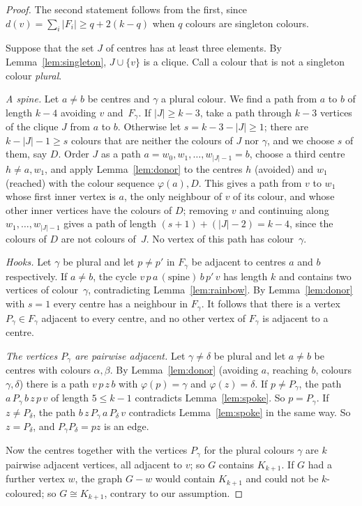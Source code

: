 \documentclass[11pt]{article}
\theoremstyle{remark}
\begin{document}
\begin{proof}
The second statement follows from the first, since
$d(v)=\sum_i|F_i|\ge q+2(k-q)$ when $q$ colours are singleton colours.

Suppose that the set $J$ of centres has at least three elements. By
Lemma~\ref{lem:singleton}, $J\cup\{v\}$ is a clique. Call a colour that is not a
singleton colour \emph{plural}.

\emph{A spine.} Let $a\ne b$ be centres and $\gamma$ a plural colour. We find a
path from $a$ to $b$ of length $k-4$ avoiding $v$ and~$F_\gamma$. If
$|J|\ge k-3$, take a path through $k-3$ vertices of the clique $J$ from $a$ to
$b$. Otherwise let $s=k-3-|J|\ge1$; there are $k-|J|-1\ge s$ colours that are
neither the colours of $J$ nor $\gamma$, and we choose $s$ of them, say $D$.
Order $J$ as a path $a=w_0,w_1,\dots,w_{|J|-1}=b$, choose a third centre $h\ne
a,w_1$, and apply Lemma~\ref{lem:donor} to the centres $h$ (avoided) and $w_1$
(reached) with the colour sequence $\varphi(a),D$. This gives a path from $v$ to
$w_1$ whose first inner vertex is $a$, the only neighbour of $v$ of its colour,
and whose other inner vertices have the colours of $D$; removing $v$ and continuing along $w_1,\dots,w_{|J|-1}$ gives a
path of length $(s+1)+(|J|-2)=k-4$, since the colours of $D$ are not colours
of~$J$. No vertex of this path has colour~$\gamma$.

\emph{Hooks.} Let $\gamma$ be plural and let $p\ne p'$ in $F_\gamma$ be
adjacent to centres $a$ and $b$ respectively. If $a\ne b$, the cycle
$v\,p\,a\,(\text{spine})\,b\,p'\,v$ has length $k$ and contains two vertices of
colour~$\gamma$, contradicting Lemma~\ref{lem:rainbow}. By
Lemma~\ref{lem:donor} with $s=1$ every centre has a neighbour in $F_\gamma$. It
follows that there is a vertex $P_\gamma\in F_\gamma$ adjacent to every centre,
and no other vertex of $F_\gamma$ is adjacent to a centre.

\emph{The vertices $P_\gamma$ are pairwise adjacent.} Let $\gamma\ne\delta$ be
plural and let $a\ne b$ be centres with colours $\alpha,\beta$. By
Lemma~\ref{lem:donor} (avoiding $a$, reaching $b$, colours $\gamma,\delta$)
there is a path $v\,p\,z\,b$ with $\varphi(p)=\gamma$ and
$\varphi(z)=\delta$. If $p\ne P_\gamma$, the path $a\,P_\gamma\,b\,z\,p\,v$ of
length $5\le k-1$ contradicts Lemma~\ref{lem:spoke}. So $p=P_\gamma$. If $z\ne P_\delta$, the path
$b\,z\,P_\gamma\,a\,P_\delta\,v$ contradicts Lemma~\ref{lem:spoke} in the same
way. So $z=P_\delta$, and $P_\gamma P_\delta=pz$ is an edge.

Now the centres together with the vertices $P_\gamma$ for the plural colours
$\gamma$ are $k$ pairwise adjacent vertices, all adjacent to $v$; so $G$
contains $K_{k+1}$. If $G$ had a further vertex $w$, the graph $G-w$ would
contain $K_{k+1}$ and could not be $k$-coloured; so $G\cong K_{k+1}$, contrary
to our assumption.
\end{proof}
\end{document}
